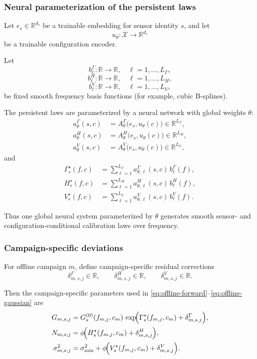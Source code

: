 \subsubsection{Neural parameterization of the persistent laws}

Let $e_s\in\mathbb R^{d_s}$ be a trainable embedding for sensor identity
$s$, and let
\[
u_\theta:\mathcal X\to\mathbb R^{d_c}
\]
be a trainable configuration encoder.

Let
\[
b^\Gamma_\ell:\mathbb R\to\mathbb R,
\quad \ell=1,\dots,L_\Gamma,
\]
\[
b^H_\ell:\mathbb R\to\mathbb R,
\quad \ell=1,\dots,L_H,
\]
\[
b^V_\ell:\mathbb R\to\mathbb R,
\quad \ell=1,\dots,L_V,
\]
be fixed smooth frequency basis functions (for example, cubic B-splines).

The persistent laws are parameterized by a neural network with global weights
$\theta$:
\begin{align}
a^\Gamma_\theta(s,c)
&=
A^\Gamma_\theta\!\bigl(e_s,u_\theta(c)\bigr)
\in\mathbb R^{L_\Gamma},
\label{eq:aGamma}
\\
a^H_\theta(s,c)
&=
A^H_\theta\!\bigl(e_s,u_\theta(c)\bigr)
\in\mathbb R^{L_H},
\label{eq:aH}
\\
a^V_\theta(s,c)
&=
A^V_\theta\!\bigl(e_s,u_\theta(c)\bigr)
\in\mathbb R^{L_V},
\label{eq:aV}
\end{align}
and
\begin{align}
\Gamma_s^\star(f,c)
&=
\sum_{\ell=1}^{L_\Gamma}
a^\Gamma_{\theta,\ell}(s,c)\,b^\Gamma_\ell(f),
\label{eq:Gamma-star-basis}
\\
H_s^\star(f,c)
&=
\sum_{\ell=1}^{L_H}
a^H_{\theta,\ell}(s,c)\,b^H_\ell(f),
\label{eq:H-star-basis}
\\
V_s^\star(f,c)
&=
\sum_{\ell=1}^{L_V}
a^V_{\theta,\ell}(s,c)\,b^V_\ell(f).
\label{eq:V-star-basis}
\end{align}

Thus one global neural system parameterized by $\theta$ generates smooth
sensor- and configuration-conditional calibration laws over frequency.

\subsubsection{Campaign-specific deviations}

For offline campaign $m$, define campaign-specific residual corrections
\[
\delta^\Gamma_{m,s,j}\in\mathbb R,
\qquad
\delta^H_{m,s,j}\in\mathbb R,
\qquad
\delta^V_{m,s,j}\in\mathbb R.
\]

Then the campaign-specific parameters used in
\eqref{eq:offline-forward}--\eqref{eq:offline-gaussian} are
\begin{align}
G_{m,s,j}
&=
G_s^{(0)}(f_{m,j},c_m)\,
\exp\!\Bigl(
\Gamma_s^\star(f_{m,j},c_m)
+
\delta^\Gamma_{m,s,j}
\Bigr),
\label{eq:campaign-gain}
\\
N_{m,s,j}
&=
\phi\!\Bigl(
H_s^\star(f_{m,j},c_m)
+
\delta^H_{m,s,j}
\Bigr),
\label{eq:campaign-floor}
\\
\sigma^2_{m,s,j}
&=
\sigma_{\min}^2
+
\phi\!\Bigl(
V_s^\star(f_{m,j},c_m)
+
\delta^V_{m,s,j}
\Bigr).
\label{eq:campaign-var}
\end{align}

